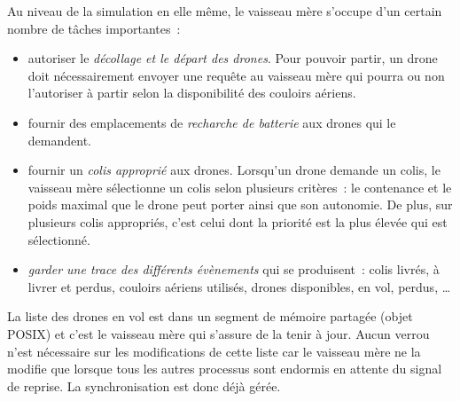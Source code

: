 Au niveau de la simulation en elle même, le vaisseau mère s'occupe d'un certain nombre de tâches importantes :
\begin{itemize}
    \item autoriser le \emph{décollage et le départ des drones}. Pour pouvoir partir, un drone doit nécessairement envoyer
        une requête au vaisseau mère qui pourra ou non l'autoriser à partir selon la disponibilité des couloirs aériens.
    \item fournir des emplacements de \emph{recharche de batterie} aux drones qui le demandent.
    \item fournir un \emph{colis approprié} aux drones. Lorsqu'un drone demande un colis, le vaisseau mère sélectionne un colis
        selon plusieurs critères : le contenance et le poids maximal que le drone peut porter ainsi que son autonomie.
        De plus, sur plusieurs colis appropriés, c'est celui dont la priorité est la plus élevée qui est sélectionné.
    \item \emph{garder une trace des différents évènements} qui se produisent :
        colis livrés, à livrer et perdus, couloirs aériens utilisés, drones disponibles, en vol, perdus, …
\end{itemize}

La liste des drones en vol est dans un segment de mémoire partagée (objet POSIX) et c'est le vaisseau mère
qui s'assure de la tenir à jour. Aucun verrou n'est nécessaire sur les modifications de cette liste car le vaisseau mère
ne la modifie que lorsque tous les autres processus sont endormis en attente du signal de reprise. La synchronisation est donc
déjà gérée.

